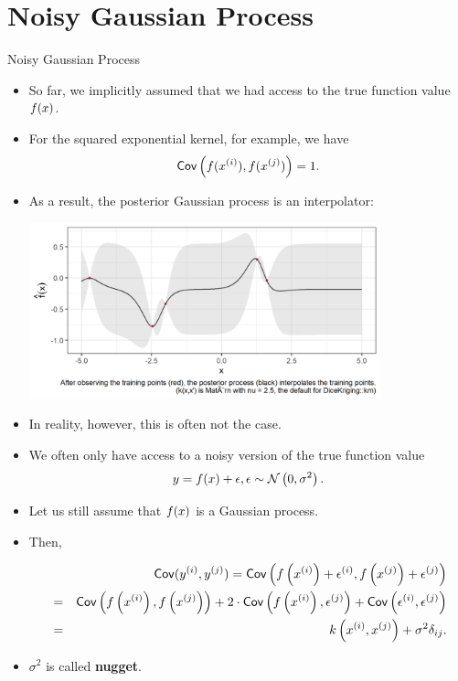 \section{Noisy Gaussian Process}

\begin{vbframe}{Noisy Gaussian Process}

\begin{itemize}
  \item So far, we implicitly assumed that we had access to the true function value $\fx$.
  \item For the squared exponential kernel, for example, we have
  $$
    \cov\left(f(\xi), f(\xi[j])\right) = 1.
  $$
  \item As a result, the posterior Gaussian process is an interpolator: 
  \begin{center}
    \includegraphics[width=0.8\textwidth]{figure_man/gp-interpolator.png}
  \end{center}

\framebreak 

  \item In reality, however, this is often not the case. 
  \item We often only have access to a noisy version of the true function value
  $$
    y = \fx + \eps, \eps \sim\mathcal{N}\left(0, \sigma^2\right).
  $$
  \item Let us still assume that $\fx$ is a Gaussian process.
  \item Then,
  \begin{footnotesize} 
  \begin{eqnarray*}
    &&\cov(y^{(i)}, y^{(j)}) = \cov\left(f\left(\xi\right) + \epsilon^{(i)}, f\left(\xi[j]\right) + \epsilon^{(j)}\right) \\
    &=& \cov\left(f\left(\xi\right), f\left(\xi[j]\right)\right) + 2 \cdot \cov\left(f\left(\xi\right), \epsilon^{(j)}\right) + \cov\left(\epsilon^{(i)}, \epsilon^{(j)}\right) 
    \\ &=& k\left(\xi, \xi[j]\right) + \sigma^2 \delta_{ij}. 
  \end{eqnarray*}
  \end{footnotesize}
  \item $\sigma^2$ is called \textbf{nugget}. 
\end{itemize}


\end{vbframe}
